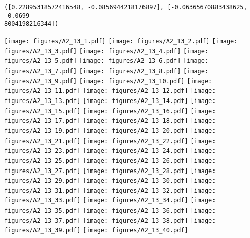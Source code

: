 \documentclass[12pt,a4paper]{article}
\begin{document}
\begin{lstlisting}
([0.22895318572416548, -0.0856944218176897], [-0.06365670883438625, -0.0699
8004198216344])
\end{lstlisting}

\texttt{[image: figures/A2\_13\_1.pdf]}
\texttt{[image: figures/A2\_13\_2.pdf]}
\texttt{[image: figures/A2\_13\_3.pdf]}
\texttt{[image: figures/A2\_13\_4.pdf]}
\texttt{[image: figures/A2\_13\_5.pdf]}
\texttt{[image: figures/A2\_13\_6.pdf]}
\texttt{[image: figures/A2\_13\_7.pdf]}
\texttt{[image: figures/A2\_13\_8.pdf]}
\texttt{[image: figures/A2\_13\_9.pdf]}
\texttt{[image: figures/A2\_13\_10.pdf]}
\texttt{[image: figures/A2\_13\_11.pdf]}
\texttt{[image: figures/A2\_13\_12.pdf]}
\texttt{[image: figures/A2\_13\_13.pdf]}
\texttt{[image: figures/A2\_13\_14.pdf]}
\texttt{[image: figures/A2\_13\_15.pdf]}
\texttt{[image: figures/A2\_13\_16.pdf]}
\texttt{[image: figures/A2\_13\_17.pdf]}
\texttt{[image: figures/A2\_13\_18.pdf]}
\texttt{[image: figures/A2\_13\_19.pdf]}
\texttt{[image: figures/A2\_13\_20.pdf]}
\texttt{[image: figures/A2\_13\_21.pdf]}
\texttt{[image: figures/A2\_13\_22.pdf]}
\texttt{[image: figures/A2\_13\_23.pdf]}
\texttt{[image: figures/A2\_13\_24.pdf]}
\texttt{[image: figures/A2\_13\_25.pdf]}
\texttt{[image: figures/A2\_13\_26.pdf]}
\texttt{[image: figures/A2\_13\_27.pdf]}
\texttt{[image: figures/A2\_13\_28.pdf]}
\texttt{[image: figures/A2\_13\_29.pdf]}
\texttt{[image: figures/A2\_13\_30.pdf]}
\texttt{[image: figures/A2\_13\_31.pdf]}
\texttt{[image: figures/A2\_13\_32.pdf]}
\texttt{[image: figures/A2\_13\_33.pdf]}
\texttt{[image: figures/A2\_13\_34.pdf]}
\texttt{[image: figures/A2\_13\_35.pdf]}
\texttt{[image: figures/A2\_13\_36.pdf]}
\texttt{[image: figures/A2\_13\_37.pdf]}
\texttt{[image: figures/A2\_13\_38.pdf]}
\texttt{[image: figures/A2\_13\_39.pdf]}
\texttt{[image: figures/A2\_13\_40.pdf]}
\end{document}
